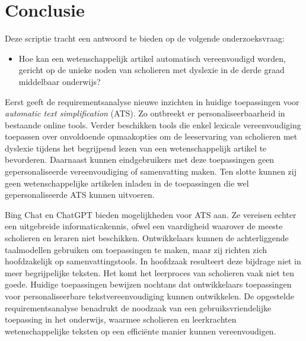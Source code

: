 
\chapter{Conclusie}%
\label{ch:conclusie}

Deze scriptie tracht een antwoord te bieden op de volgende onderzoeksvraag:

\begin{itemize}
	\item Hoe kan een wetenschappelijk artikel automatisch vereenvoudigd worden, gericht op de unieke noden van scholieren met dyslexie in de derde graad middelbaar onderwijs?
\end{itemize}

Eerst geeft de requirementsanalyse nieuwe inzichten in huidige toepassingen voor \textit{automatic text simplification} (ATS). Zo ontbreekt er personaliseerbaarheid in bestaande online tools. Verder beschikken tools die enkel lexicale vereenvoudiging toepassen over onvoldoende opmaakopties om de leeservaring van scholieren met dyslexie tijdens het begrijpend lezen van een wetenschappelijk artikel te bevorderen. Daarnaast kunnen eindgebruikers met deze toepassingen geen gepersonaliseerde vereenvoudiging of samenvatting maken. Ten slotte kunnen zij geen wetenschappelijke artikelen inladen in de toepassingen die wel gepersonaliseerde ATS kunnen uitvoeren. 

\medspace

Bing Chat en ChatGPT bieden mogelijkheden voor ATS aan. Ze vereisen echter een uitgebreide informaticakennis, ofwel een vaardigheid waarover de meeste scholieren en leraren niet beschikken. Ontwikkelaars kunnen de achterliggende taalmodellen gebruiken om toepassingen te maken, maar zij richten zich hoofdzakelijk op samenvattingstools. In hoofdzaak resulteert deze bijdrage niet in meer begrijpelijke teksten. Het komt het leerproces van scholieren vaak niet ten goede. Huidige toepassingen bewijzen nochtans dat ontwikkelaars toepassingen voor personaliseerbare tekstvereenvoudiging kunnen ontwikkelen. De opgestelde requirementsanalyse benadrukt de noodzaak van een gebruiksvriendelijke toepassing in het onderwijs, waarmee scholieren en leerkrachten wetenschappelijke teksten op een efficiënte manier kunnen vereenvoudigen.

\medspace

